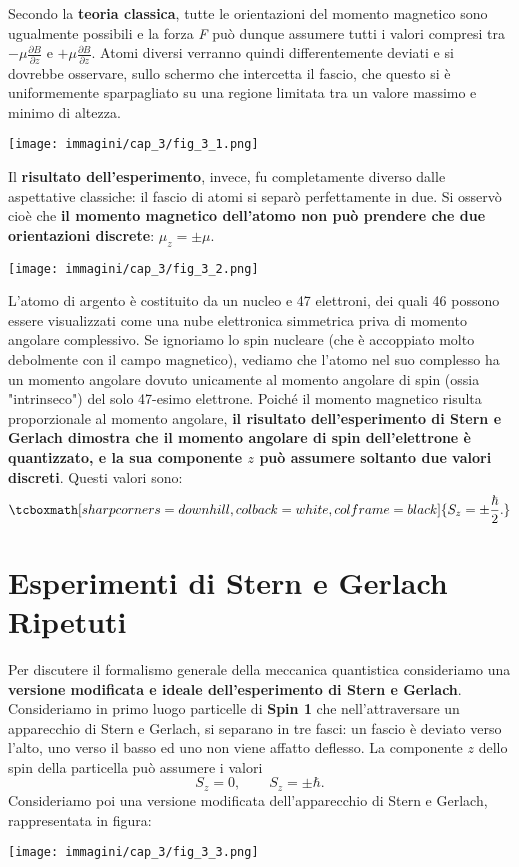 Secondo la \textbf{teoria classica}, tutte le orientazioni del momento magnetico sono ugualmente possibili e la forza \emph{F} può dunque assumere tutti i valori compresi tra $-\mu \frac{\partial B}{\partial z}$ e $+\mu \frac{\partial B}{\partial z}$. Atomi diversi verranno quindi differentemente deviati e si dovrebbe osservare, sullo schermo che intercetta il fascio, che questo si è uniformemente sparpagliato su una regione limitata tra un valore massimo e minimo di altezza.
\begin{center}
\texttt{[image: immagini/cap\_3/fig\_3\_1.png]}
\end{center}
Il \textbf{risultato dell'esperimento}, invece, fu completamente diverso dalle aspettative classiche: il fascio di atomi si separò perfettamente in due. Si osservò cioè che \textbf{il momento magnetico dell'atomo non può prendere che due orientazioni discrete}: $\mu_z=\pm \mu $.\\
\begin{center}
\texttt{[image: immagini/cap\_3/fig\_3\_2.png]}
\end{center}

L'atomo di argento è costituito da un nucleo e 47 elettroni, dei quali 46 possono essere visualizzati come una nube elettronica simmetrica priva di momento angolare complessivo. Se ignoriamo lo spin nucleare (che è accoppiato molto debolmente con il campo magnetico), vediamo che l'atomo nel suo complesso ha un momento angolare dovuto unicamente al momento angolare di spin (ossia "intrinseco") del solo 47-esimo elettrone. Poiché il momento magnetico risulta proporzionale al momento angolare, \textbf{il risultato dell'esperimento di Stern e Gerlach dimostra che il momento angolare di spin dell'elettrone è quantizzato, e la sua componente $z$ può assumere soltanto due valori discreti}. Questi valori sono:
	\begin{equation}
		\tcboxmath[sharp corners=downhill, colback=white, colframe=black]{
			S_z= \pm \frac{\hbar}{2}.
			}
	\end{equation} 
\section{Esperimenti di Stern e Gerlach Ripetuti} 
Per discutere il formalismo generale della meccanica quantistica consideriamo una \textbf{versione modificata e ideale dell'esperimento di Stern e Gerlach}.\\
 
Consideriamo in primo luogo particelle di \textbf{Spin 1} che nell'attraversare un apparecchio di Stern e Gerlach, si separano in tre fasci: un fascio è deviato verso l'alto, uno verso il basso ed uno non viene affatto deflesso. La componente $z$ dello spin della particella può assumere i valori
	\begin{equation}
		S_z=0, \qquad S_z= \pm \hbar .
	\end{equation}
Consideriamo poi una versione modificata dell'apparecchio di Stern e Gerlach, rappresentata in figura: \\
\begin{center}
\texttt{[image: immagini/cap\_3/fig\_3\_3.png]}
\end{center}

